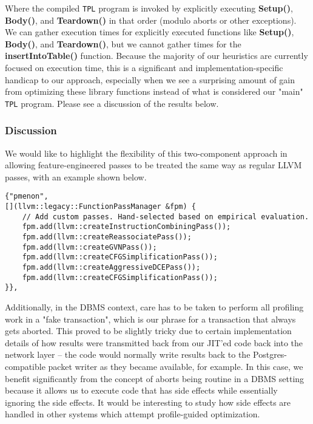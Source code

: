 \documentclass{vldb}
\newcommand{\tpl}{\texttt{TPL}\xspace}
\newcommand{\dbCode}[1]{{\sffamily\small \textbf{#1}}\xspace}
\begin{document}
Where the compiled \tpl program is invoked by explicitly executing \dbCode{Setup()}, \dbCode{Body()}, and \dbCode{Teardown()} in that order (modulo aborts or other exceptions). We can gather execution times for explicitly executed functions like \dbCode{Setup()}, \dbCode{Body()}, and \dbCode{Teardown()}, but we cannot gather times for the \dbCode{insertIntoTable()} function. Because the majority of our heuristics are currently focused on execution time, this is a significant and implementation-specific handicap to our approach, especially when we see a surprising amount of gain from optimizing these library functions instead of what is considered our "main" \tpl program. Please see a discussion of the results below.

\subsubsection{Discussion}

We would like to highlight the flexibility of this two-component approach in allowing feature-engineered passes to be treated the same way as regular LLVM passes, with an example shown below.

\begin{lstlisting}
{"pmenon",
[](llvm::legacy::FunctionPassManager &fpm) {
    // Add custom passes. Hand-selected based on empirical evaluation.
    fpm.add(llvm::createInstructionCombiningPass());
    fpm.add(llvm::createReassociatePass());
    fpm.add(llvm::createGVNPass());
    fpm.add(llvm::createCFGSimplificationPass());
    fpm.add(llvm::createAggressiveDCEPass());
    fpm.add(llvm::createCFGSimplificationPass());
}}, 
\end{lstlisting}

Additionally, in the DBMS context, care has to be taken to perform all profiling work in a "fake transaction", which is our phrase for a transaction that always gets aborted. This proved to be slightly tricky due to certain implementation details of how results were transmitted back from our JIT'ed code back into the network layer -- the code would normally write results back to the Postgres-compatible packet writer as they became available, for example. In this case, we benefit significantly from the concept of aborts being routine in a DBMS setting because it allows us to execute code that has side effects while essentially ignoring the side effects. It would be interesting to study how side effects are handled in other systems which attempt profile-guided optimization.
\end{document}
